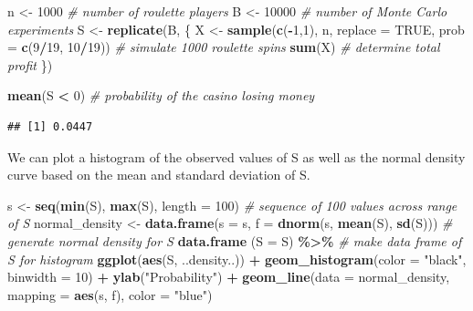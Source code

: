 \documentclass[
]{article}
\newenvironment{Shaded}{\begin{snugshade}}{\end{snugshade}}
\newcommand{\CommentTok}[1]{\textcolor[rgb]{0.56,0.35,0.01}{\textit{#1}}}
\newcommand{\DataTypeTok}[1]{\textcolor[rgb]{0.13,0.29,0.53}{#1}}
\newcommand{\DecValTok}[1]{\textcolor[rgb]{0.00,0.00,0.81}{#1}}
\newcommand{\KeywordTok}[1]{\textcolor[rgb]{0.13,0.29,0.53}{\textbf{#1}}}
\newcommand{\NormalTok}[1]{#1}
\newcommand{\OperatorTok}[1]{\textcolor[rgb]{0.81,0.36,0.00}{\textbf{#1}}}
\newcommand{\OtherTok}[1]{\textcolor[rgb]{0.56,0.35,0.01}{#1}}
\newcommand{\StringTok}[1]{\textcolor[rgb]{0.31,0.60,0.02}{#1}}
\begin{document}
\begin{Shaded}
\begin{Highlighting}[]
\NormalTok{n \textless{}{-}}\StringTok{ }\DecValTok{1000}    \CommentTok{\# number of roulette players}
\NormalTok{B \textless{}{-}}\StringTok{ }\DecValTok{10000}    \CommentTok{\# number of Monte Carlo experiments}
\NormalTok{S \textless{}{-}}\StringTok{ }\KeywordTok{replicate}\NormalTok{(B, \{}
\NormalTok{    X \textless{}{-}}\StringTok{ }\KeywordTok{sample}\NormalTok{(}\KeywordTok{c}\NormalTok{(}\OperatorTok{{-}}\DecValTok{1}\NormalTok{,}\DecValTok{1}\NormalTok{), n, }\DataTypeTok{replace =} \OtherTok{TRUE}\NormalTok{, }\DataTypeTok{prob =} \KeywordTok{c}\NormalTok{(}\DecValTok{9}\OperatorTok{/}\DecValTok{19}\NormalTok{, }\DecValTok{10}\OperatorTok{/}\DecValTok{19}\NormalTok{))    }\CommentTok{\# simulate 1000 roulette spins}
    \KeywordTok{sum}\NormalTok{(X)    }\CommentTok{\# determine total profit}
\NormalTok{\})}

\KeywordTok{mean}\NormalTok{(S }\OperatorTok{\textless{}}\StringTok{ }\DecValTok{0}\NormalTok{)    }\CommentTok{\# probability of the casino losing money}
\end{Highlighting}
\end{Shaded}

\begin{verbatim}
## [1] 0.0447
\end{verbatim}

We can plot a histogram of the observed values of S as well as the
normal density curve based on the mean and standard deviation of S.

\begin{Shaded}
\begin{Highlighting}[]
\NormalTok{s \textless{}{-}}\StringTok{ }\KeywordTok{seq}\NormalTok{(}\KeywordTok{min}\NormalTok{(S), }\KeywordTok{max}\NormalTok{(S), }\DataTypeTok{length =} \DecValTok{100}\NormalTok{)    }\CommentTok{\# sequence of 100 values across range of S}
\NormalTok{normal\_density \textless{}{-}}\StringTok{ }\KeywordTok{data.frame}\NormalTok{(}\DataTypeTok{s =}\NormalTok{ s, }\DataTypeTok{f =} \KeywordTok{dnorm}\NormalTok{(s, }\KeywordTok{mean}\NormalTok{(S), }\KeywordTok{sd}\NormalTok{(S))) }\CommentTok{\# generate normal density for S}
\KeywordTok{data.frame}\NormalTok{ (}\DataTypeTok{S =}\NormalTok{ S) }\OperatorTok{\%\textgreater{}\%}\StringTok{    }\CommentTok{\# make data frame of S for histogram}
\StringTok{    }\KeywordTok{ggplot}\NormalTok{(}\KeywordTok{aes}\NormalTok{(S, ..density..)) }\OperatorTok{+}
\StringTok{    }\KeywordTok{geom\_histogram}\NormalTok{(}\DataTypeTok{color =} \StringTok{"black"}\NormalTok{, }\DataTypeTok{binwidth =} \DecValTok{10}\NormalTok{) }\OperatorTok{+}
\StringTok{    }\KeywordTok{ylab}\NormalTok{(}\StringTok{"Probability"}\NormalTok{) }\OperatorTok{+}
\StringTok{    }\KeywordTok{geom\_line}\NormalTok{(}\DataTypeTok{data =}\NormalTok{ normal\_density, }\DataTypeTok{mapping =} \KeywordTok{aes}\NormalTok{(s, f), }\DataTypeTok{color =} \StringTok{"blue"}\NormalTok{)}
\end{Highlighting}
\end{Shaded}
\end{document}
